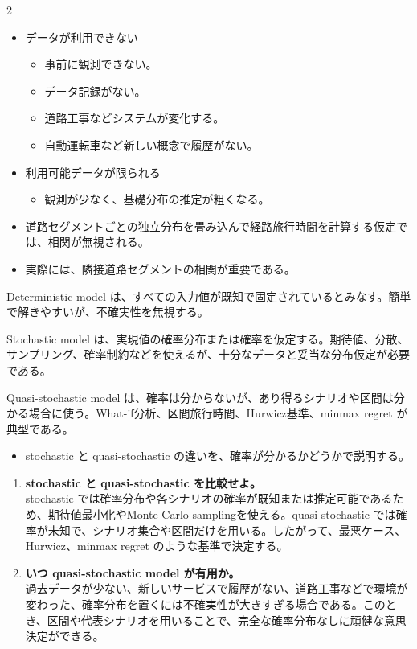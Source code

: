 \clearpage
{}
\begin{multicols}{2}\footnotesize\raggedcolumns
{}
\begin{itemize}
\item データが利用できない
\begin{itemize}
\item 事前に観測できない。
\item データ記録がない。
\item 道路工事などシステムが変化する。
\item 自動運転車など新しい概念で履歴がない。
\end{itemize}
\item 利用可能データが限られる
\begin{itemize}
\item 観測が少なく、基礎分布の推定が粗くなる。
\end{itemize}
\item 道路セグメントごとの独立分布を畳み込んで経路旅行時間を計算する仮定では、相関が無視される。
\item 実際には、隣接道路セグメントの相関が重要である。
\end{itemize}
Deterministic model は、すべての入力値が既知で固定されているとみなす。簡単で解きやすいが、不確実性を無視する。\par

Stochastic model は、実現値の確率分布または確率を仮定する。期待値、分散、サンプリング、確率制約などを使えるが、十分なデータと妥当な分布仮定が必要である。\par

Quasi-stochastic model は、確率は分からないが、あり得るシナリオや区間は分かる場合に使う。What-if分析、区間旅行時間、Hurwicz基準、minmax regret が典型である。\par
{}
\begin{itemize}
\item stochastic と quasi-stochastic の違いを、確率が分かるかどうかで説明する。
\end{itemize}
\begin{enumerate}
\item \textbf{stochastic と quasi-stochastic を比較せよ。}\\stochastic では確率分布や各シナリオの確率が既知または推定可能であるため、期待値最小化やMonte Carlo samplingを使える。quasi-stochastic では確率が未知で、シナリオ集合や区間だけを用いる。したがって、最悪ケース、Hurwicz、minmax regret のような基準で決定する。
\item \textbf{いつ quasi-stochastic model が有用か。}\\過去データが少ない、新しいサービスで履歴がない、道路工事などで環境が変わった、確率分布を置くには不確実性が大きすぎる場合である。このとき、区間や代表シナリオを用いることで、完全な確率分布なしに頑健な意思決定ができる。
\end{enumerate}
\end{multicols}

